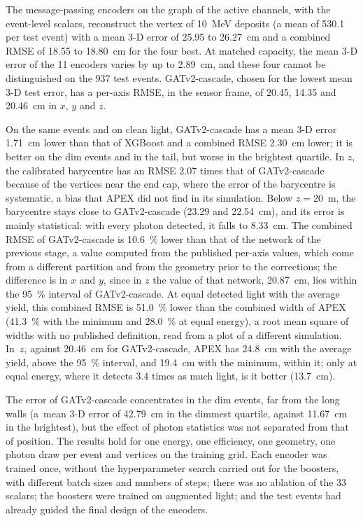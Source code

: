 \label{sec:conclusoes}

The message-passing encoders on the graph of the active channels, with the event-level scalars, reconstruct the vertex of \qty{10}{\MeV} deposits (a mean of \qty{530.1}{\pe} per test event) with a mean 3-D error of \num{25.95} to \qty{26.27}{\cm} and a combined RMSE of \num{18.55} to \qty{18.80}{\cm} for the four best. At matched capacity, the mean 3-D error of the \num{11} encoders varies by up to \qty{2.89}{\cm}, and these four cannot be distinguished on the \num{937} test events. GATv2-cascade, chosen for the lowest mean 3-D test error, has a per-axis RMSE, in the sensor frame, of \num{20.45}, \num{14.35} and \qty{20.46}{\cm} in $x$, $y$ and $z$.

On the same events and on clean light, GATv2-cascade has a mean 3-D error \qty{1.71}{\cm} lower than that of XGBoost and a combined RMSE \qty{2.30}{\cm} lower; it is better on the dim events and in the tail, but worse in the brightest quartile. In $z$, the calibrated barycentre has an RMSE \num{2.07} times that of GATv2-cascade because of the vertices near the end cap, where the error of the barycentre is systematic, a bias that APEX did not find in its simulation. Below $z = {}$\qty{20}{\m}, the barycentre stays close to GATv2-cascade (\num{23.29} and \qty{22.54}{\cm}), and its error is mainly statistical: with every photon detected, it falls to \qty{8.33}{\cm}. The combined RMSE of GATv2-cascade is \qty{10.6}{\percent} lower than that of the network of the previous stage, a value computed from the published per-axis values, which come from a different partition and from the geometry prior to the corrections; the difference is in $x$ and $y$, since in $z$ the value of that network, \qty{20.87}{\cm}, lies within the \qty{95}{\percent} interval of GATv2-cascade. At equal detected light with the average yield, this combined RMSE is \qty{51.0}{\percent} lower than the combined width of APEX (\qty{41.3}{\percent} with the minimum and \qty{28.0}{\percent} at equal energy), a root mean square of widths with no published definition, read from a plot of a different simulation. In~$z$, against \qty{20.46}{\cm} for GATv2-cascade, APEX has \qty{24.8}{\cm} with the average yield, above the \qty{95}{\percent} interval, and \qty{19.4}{\cm} with the minimum, within it; only at equal energy, where it detects \num{3.4} times as much light, is it better (\qty{13.7}{\cm}).

{ The error of GATv2-cascade concentrates in the dim events, far from the long walls (a~mean 3-D error of \qty{42.79}{\cm} in the dimmest quartile, against \qty{11.67}{\cm} in the brightest), but the effect of photon statistics was not separated from that of position. The results hold for one energy, one efficiency, one geometry, one photon draw per event and vertices on the training grid. Each encoder was trained once, without the hyperparameter search carried out for the boosters, with different batch sizes and numbers of steps; there was no ablation of the \num{33} scalars; the boosters were trained on augmented light; and the test events had already guided the final design of the encoders.\par}

